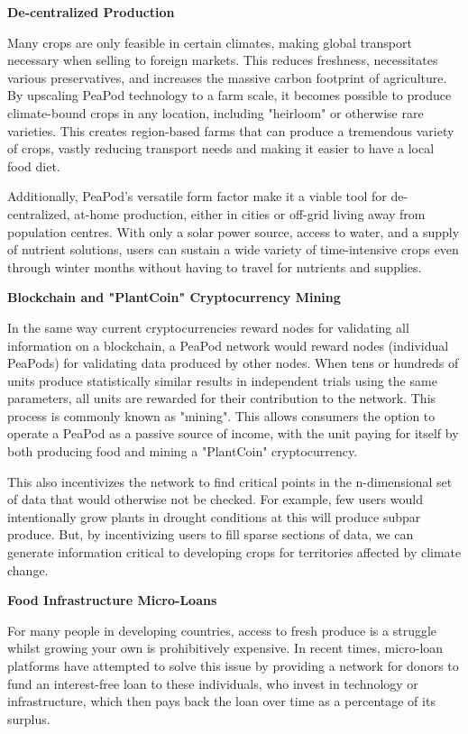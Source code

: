 \documentclass{report}
\begin{document}
\textbf{De-centralized Production} %

Many crops are only feasible in certain climates, making global transport necessary when selling to foreign markets. This reduces freshness, necessitates various preservatives, and increases the massive carbon footprint of agriculture. By upscaling PeaPod technology to a farm scale, it becomes possible to produce climate-bound crops in any location, including "heirloom" or otherwise rare varieties. This creates region-based farms that can produce a tremendous variety of crops, vastly reducing transport needs and making it easier to have a local food diet.

Additionally, PeaPod's versatile form factor make it a viable tool for de-centralized, at-home production, either in cities or off-grid living away from population centres. With only a solar power source, access to water, and a supply of nutrient solutions, users can sustain a wide variety of time-intensive crops even through winter months without having to travel for nutrients and supplies.

\newpage

\textbf{Blockchain and "PlantCoin" Cryptocurrency Mining}

In the same way current cryptocurrencies reward nodes for validating all information on a blockchain, a PeaPod network would reward nodes (individual PeaPods) for validating data produced by other nodes. When tens or hundreds of units produce statistically similar results in independent trials using the same parameters, all units are rewarded for their contribution to the network. This process is commonly known as "mining". This allows consumers the option to operate a PeaPod as a passive source of income, with the unit paying for itself by both producing food and mining a "PlantCoin" cryptocurrency.

This also incentivizes the network to find critical points in the n-dimensional set of data that would otherwise not be checked. For example, few users would intentionally grow plants in drought conditions at this will produce subpar produce. But, by incentivizing users to fill sparse sections of data, we can generate information critical to developing crops for territories affected by climate change.

\textbf{Food Infrastructure Micro-Loans}

For many people in developing countries, access to fresh produce is a struggle whilst growing your own is prohibitively expensive. In recent times, micro-loan platforms have attempted to solve this issue by providing a network for donors to fund an interest-free loan to these individuals, who invest in technology or infrastructure, which then pays back the loan over time as a percentage of its surplus. 
\end{document}
